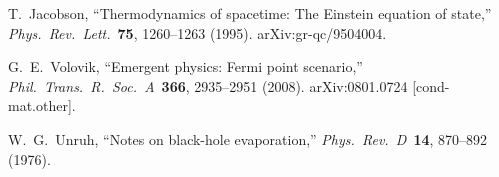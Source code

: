 T.~Jacobson, ``Thermodynamics of spacetime: The Einstein equation of state,'' \emph{Phys.\ Rev.\ Lett.}\ \textbf{75}, 1260--1263 (1995). arXiv:gr-qc/9504004.

G.~E.~Volovik, ``Emergent physics: Fermi point scenario,'' \emph{Phil.\ Trans.\ R.\ Soc.\ A}\ \textbf{366}, 2935--2951 (2008). arXiv:0801.0724 [cond-mat.other].



W.~G.~Unruh, ``Notes on black-hole evaporation,'' \emph{Phys.\ Rev.\ D}\ \textbf{14}, 870--892 (1976).

